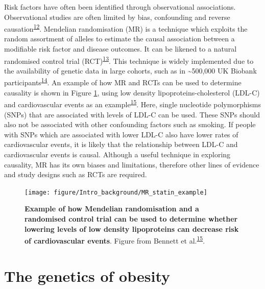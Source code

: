 \documentclass[11pt,twoside]{bristolthesis}
\begin{document}
Risk factors have often been identified through observational associations. Observational studies are often limited by bias, confounding and reverse causation\textsuperscript{\protect\hyperlink{ref-Davies2018}{12}}. Mendelian randomisation (MR) is a technique which exploits the random assortment of alleles to estimate the causal association between a modifiable risk factor and disease outcomes. It can be likened to a natural randomised control trial (RCT)\textsuperscript{\protect\hyperlink{ref-Gill2020}{13}}. This technique is widely implemented due to the availability of genetic data in large cohorts, such as in \textasciitilde500,000 UK Biobank participants\textsuperscript{\protect\hyperlink{ref-Bycroft2018}{14}}. An example of how MR and RCTs can be used to determine causality is shown in Figure \ref{fig:MR-statins}, using low density lipoproteins-cholesterol (LDL-C) and cardiovascular events as an example\textsuperscript{\protect\hyperlink{ref-Bennett2017}{15}}. Here, single nucleotide polymorphisms (SNPs) that are associated with levels of LDL-C can be used. These SNPs should also not be associated with other confounding factors such as smoking. If people with SNPs which are associated with lower LDL-C also have lower rates of cardiovascular events, it is likely that the relationship between LDL-C and cardiovascular events is causal. Although a useful technique in exploring causality, MR has its own biases and limitations, therefore other lines of evidence and study designs such as RCTs are required.



\begin{figure}
\texttt{[image: figure/Intro\_background/MR\_statin\_example]} \caption[Mendelian randomisation example using LDL levels and cardiovascular events]{\textbf{Example of how Mendelian randomisation and a randomised control trial can be used to determine whether lowering levels of low density lipoproteins can decrease risk of cardiovascular events}. Figure from Bennett et al.\textsuperscript{\protect\hyperlink{ref-Bennett2017}{15}}.}\label{fig:MR-statins}
\end{figure}
\hypertarget{the-genetics-of-obesity}{%
\section{The genetics of obesity}\label{the-genetics-of-obesity}}
\end{document}
